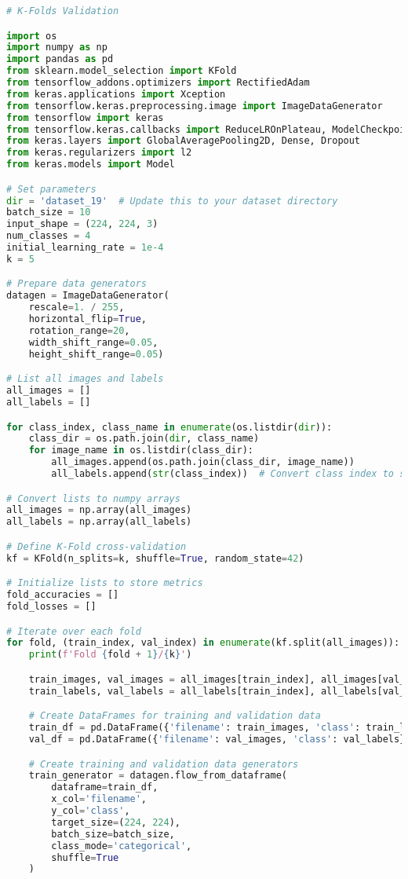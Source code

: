 \begin{lstlisting}[language=Python]
# K-Folds Validation

import os
import numpy as np
import pandas as pd
from sklearn.model_selection import KFold
from tensorflow_addons.optimizers import RectifiedAdam
from keras.applications import Xception
from tensorflow.keras.preprocessing.image import ImageDataGenerator
from tensorflow import keras
from tensorflow.keras.callbacks import ReduceLROnPlateau, ModelCheckpoint, EarlyStopping
from keras.layers import GlobalAveragePooling2D, Dense, Dropout
from keras.regularizers import l2
from keras.models import Model

# Set parameters
dir = 'dataset_19'  # Update this to your dataset directory
batch_size = 10
input_shape = (224, 224, 3)
num_classes = 4
initial_learning_rate = 1e-4
k = 5

# Prepare data generators
datagen = ImageDataGenerator(
    rescale=1. / 255,
    horizontal_flip=True,
    rotation_range=20,
    width_shift_range=0.05,
    height_shift_range=0.05)

# List all images and labels
all_images = []
all_labels = []

for class_index, class_name in enumerate(os.listdir(dir)):
    class_dir = os.path.join(dir, class_name)
    for image_name in os.listdir(class_dir):
        all_images.append(os.path.join(class_dir, image_name))
        all_labels.append(str(class_index))  # Convert class index to string

# Convert lists to numpy arrays
all_images = np.array(all_images)
all_labels = np.array(all_labels)

# Define K-Fold cross-validation
kf = KFold(n_splits=k, shuffle=True, random_state=42)

# Initialize lists to store metrics
fold_accuracies = []
fold_losses = []

# Iterate over each fold
for fold, (train_index, val_index) in enumerate(kf.split(all_images)):
    print(f'Fold {fold + 1}/{k}')

    train_images, val_images = all_images[train_index], all_images[val_index]
    train_labels, val_labels = all_labels[train_index], all_labels[val_index]

    # Create DataFrames for training and validation data
    train_df = pd.DataFrame({'filename': train_images, 'class': train_labels})
    val_df = pd.DataFrame({'filename': val_images, 'class': val_labels})

    # Create training and validation data generators
    train_generator = datagen.flow_from_dataframe(
        dataframe=train_df,
        x_col='filename',
        y_col='class',
        target_size=(224, 224),
        batch_size=batch_size,
        class_mode='categorical',
        shuffle=True
    )


\end{lstlisting}
